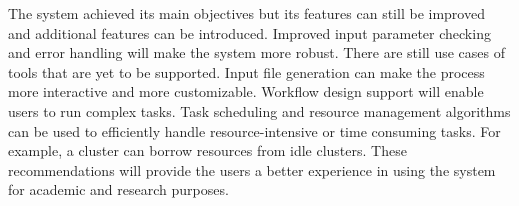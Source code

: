 \documentclass[journal]{./IEEE/IEEEtran}
\begin{document}
The system achieved its main objectives but its features can still be improved and additional features can be introduced. Improved input parameter checking and error handling will make the system more robust. There are still use cases of tools that are yet to be supported. Input file generation can make the process more interactive and more customizable.  Workflow design support will enable users to run complex tasks. Task scheduling and resource management algorithms can be used to efficiently handle resource-intensive or time consuming tasks. For example, a cluster can borrow resources from idle clusters. These recommendations will provide the users a better experience in using the system for academic and research purposes. 












\end{document}
